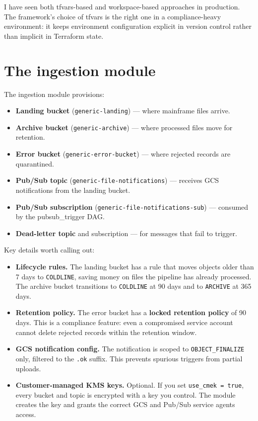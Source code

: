 \documentclass[
  11pt,
  british,
  oneside]{book}
\providecommand{\tightlist}{%
  \setlength{\itemsep}{0pt}\setlength{\parskip}{0pt}}
\begin{document}
I have seen both tfvars-based and workspace-based approaches in
production. The framework's choice of tfvars is the right one in a
compliance-heavy environment: it keeps environment configuration
explicit in version control rather than implicit in Terraform state.

\hypertarget{the-ingestion-module}{%
\section{The ingestion module}\label{the-ingestion-module}}

The ingestion module provisions:

\begin{itemize}
\tightlist
\item
  \textbf{Landing bucket} (\texttt{generic-landing}) --- where mainframe
  files arrive.
\item
  \textbf{Archive bucket} (\texttt{generic-archive}) --- where processed
  files move for retention.
\item
  \textbf{Error bucket} (\texttt{generic-error-bucket}) --- where
  rejected records are quarantined.
\item
  \textbf{Pub/Sub topic} (\texttt{generic-file-notifications}) ---
  receives GCS notifications from the landing bucket.
\item
  \textbf{Pub/Sub subscription}
  (\texttt{generic-file-notifications-sub}) --- consumed by the
  pubsub\_trigger DAG.
\item
  \textbf{Dead-letter topic} and subscription --- for messages that fail
  to trigger.
\end{itemize}

Key details worth calling out:

\begin{itemize}
\tightlist
\item
  \textbf{Lifecycle rules.} The
  landing bucket has a rule that moves objects older than 7 days to
  \texttt{COLDLINE}, saving money on files the pipeline has already
  processed. The archive bucket transitions to \texttt{COLDLINE} at 90
  days and to \texttt{ARCHIVE} at 365 days.
\item
  \textbf{Retention policy.} The error bucket has a \textbf{locked
  retention policy} of 90 days. This is a compliance feature: even a
  compromised service account cannot delete rejected records within the
  retention window.
\item
  \textbf{GCS notification config.} The notification is scoped to
  \texttt{OBJECT\_FINALIZE} only, filtered to the \texttt{.ok} suffix.
  This prevents spurious triggers from partial uploads.
\item
  \textbf{Customer-managed KMS keys.} Optional. If you set
  \texttt{use\_cmek\ =\ true}, every bucket and topic is encrypted with
  a key you control. The module creates the key and grants the correct
  GCS and Pub/Sub service agents access.
\end{itemize}
\end{document}
